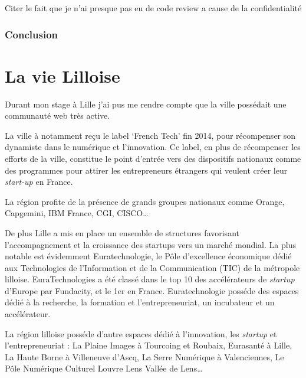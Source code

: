 \documentclass[12pt,a4paper]{article}
\begin{document}
  Citer le fait que je n'ai presque pas eu de code review a cause de la
  confidentialité

  \subsubsection{Conclusion}\label{conclusion-1}

  \newpage

  \section{La vie Lilloise}\label{la-vie-lilloise}

  Durant mon stage à Lille j'ai pus me rendre compte que la ville
  possédait une communauté web très active.

  \bigskip

  La ville à notamment reçu le label `French Tech' fin 2014, pour
  récompenser son dynamiste dans le numérique et l'innovation. Ce label,
  en plus de récompenser les efforts de la ville, constitue le point
  d'entrée vers des dispositifs nationaux comme des programmes pour
  attirer les entrepreneurs étrangers qui veulent créer leur
  \emph{start-up} en France.

  \bigskip

  La région profite de la présence de grands groupes nationaux comme
  Orange, Capgemini, IBM France, CGI, CISCO\ldots{}

  \bigskip

  De plus Lille a mis en place un ensemble de structures favorisant
  l'accompagnement et la croissance des startups vers un marché mondial.
  La plus notable est évidemment Euratechnologie, le Pôle d'excellence
  économique dédié aux Technologies de l'Information et de la
  Communication (TIC) de la métropole lilloise. EuraTechnologies a été
  classé dans le top 10 des accélérateurs de \emph{startup} d'Europe par
  Fundacity, et le 1er en France. Euratechnologie posséde des espaces
  dédié à la recherche, la formation et l'entrepreneuriat, un incubateur
  et un accélérateur.

  \bigskip

  La région lilloise posséde d'autre espaces dédié à l'innovation, les
  \emph{startup} et l'entrepreneuriat : La Plaine Images à Tourcoing et
  Roubaix, Eurasanté à Lille, La Haute Borne à Villeneuve d'Ascq, La Serre
  Numérique à Valenciennes, Le Pôle Numérique Culturel Louvre Lens Vallée
  de Lens\ldots{}

  \bigskip
\end{document}
